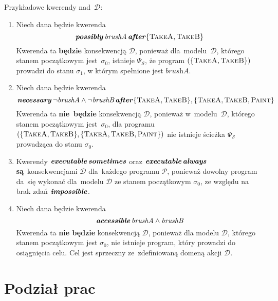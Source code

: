 \documentclass[11pt,a4paper]{article}
\DeclareMathOperator{\After}{\textbf{\textit{after}}}
\DeclareMathOperator{\Impossible}{\textbf{\textit{impossible}}}
\DeclareMathOperator{\Always}{\textbf{\textit{always}}}
\DeclareMathOperator{\Sometimes}{\textbf{\textit{sometimes}}}
\DeclareMathOperator{\Executable}{\textbf{\textit{executable}}}
\DeclareMathOperator{\Accessible}{\textbf{\textit{accessible}}}
\DeclareMathOperator{\Possibly}{\textbf{\textit{possibly}}}
\DeclareMathOperator{\Necessary}{\textbf{\textit{necessary}}}
\begin{document}
Przykładowe kwerendy nad~$\mathcal{D}$:

\begin{enumerate}
    \item Niech dana będzie kwerenda
    $$ \Possibly \textit{brushA} \After \{ \textsc{TakeA} , \textsc{TakeB} \} $$
    Kwerenda ta \textbf{będzie} konsekwencją $\mathcal{D}$, ponieważ dla~modelu~$\mathcal{D}$, którego stanem początkowym jest~$\sigma_0$, istnieje $\Psi_\mathcal{S}$, że program $(\{ \textsc{TakeA} , \textsc{TakeB} \})$ prowadzi do stanu $\sigma_1$, w którym spełnione jest $\textit{brushA}$.

    \item Niech dana będzie kwerenda
    $$ \Necessary \neg \textit{brushA} \land \neg \textit{brushB} \After \{ \textsc{TakeA}, \textsc{TakeB} \}, \{ \textsc{TakeA}, \textsc{TakeB}, \textsc{Paint} \} $$
    Kwerenda ta \textbf{nie~będzie} konsekwencją $\mathcal{D}$, ponieważ w~modelu~$\mathcal{D}$, którego stanem początkowym jest~$\sigma_0$, dla programu $(\{ \textsc{TakeA}, \textsc{TakeB} \}, \{ \textsc{TakeA}, \textsc{TakeB}, \textsc{Paint} \})$ nie istnieje ścieżka $\Psi_\mathcal{S}$ prowadząca do stanu $\sigma_0$.

    \item Kwerendy $\Executable \Sometimes$ oraz $\Executable \Always$ \textbf{są}~konsekwencjami $\mathcal{D}$ dla~każdego programu $\mathcal{P}$, ponieważ dowolny program da~się wykonać dla~modelu $\mathcal{D}$ ze stanem początkowym $\sigma_0$, ze względu na brak zdań $\Impossible$.

    \item Niech dana będzie kwerenda
    $$ \Accessible  \textit{brushA} \land \textit{brushB} $$
    Kwerenda ta \textbf{nie będzie} konsekwencją $\mathcal{D}$, ponieważ dla modelu $\mathcal{D}$, którego stanem początkowym jest $\sigma_0$, nie istnieje program, który prowadzi do osiągnięcia celu. Cel jest sprzeczny ze~zdefiniowaną domeną akcji $\mathcal{D}$.
\end{enumerate}

\section{Podział prac}
\end{document}
